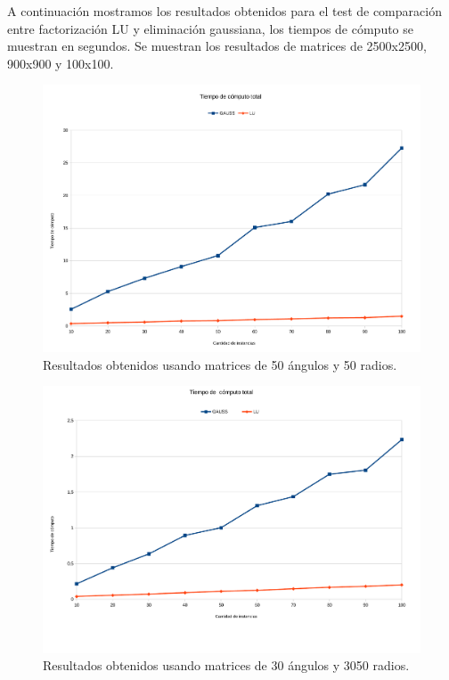 A continuación mostramos los resultados obtenidos para el test de comparación entre factorización LU y eliminación gaussiana, los tiempos de cómputo se muestran en segundos. Se muestran los resultados de matrices de 2500x2500, 900x900 y 100x100. 


\begin{figure}[H]{}
\centering
\includegraphics[scale=0.5]{graphs/gaussVsLU1.pdf}
\caption{Resultados obtenidos usando matrices de 50 ángulos y 50 radios.}
\label{gaussVsLU1}
\end{figure}

\begin{figure}[H]{}
\centering
\includegraphics[scale=0.5]{graphs/gaussVsLU2.pdf}
\caption{Resultados obtenidos usando matrices de 30 ángulos y 3050 radios.}
\label{gaussVsLU2}
\end{figure}

